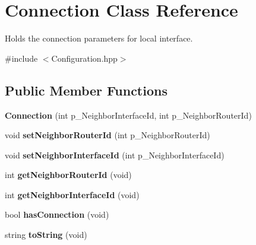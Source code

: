 \hypertarget{classConnection}{\section{Connection Class Reference}
\label{classConnection}
}


Holds the connection parameters for local interface.  




{\ttfamily \#include $<$Configuration.\-hpp$>$}

\subsection*{Public Member Functions}
\begin{DoxyCompactItemize}
\item 
\hypertarget{classConnection_a9686aa58b79ed0eed5ae0d4d2e67f063}{{\bfseries Connection} (int p\-\_\-\-Neighbor\-Interface\-Id, int p\-\_\-\-Neighbor\-Router\-Id)}\label{classConnection_a9686aa58b79ed0eed5ae0d4d2e67f063}

\item 
\hypertarget{classConnection_ac29c2a46399ef547746c308a74cda281}{void {\bfseries set\-Neighbor\-Router\-Id} (int p\-\_\-\-Neighbor\-Router\-Id)}\label{classConnection_ac29c2a46399ef547746c308a74cda281}

\item 
\hypertarget{classConnection_ab782704880dbb2a09dcdaf32ffc933fa}{void {\bfseries set\-Neighbor\-Interface\-Id} (int p\-\_\-\-Neighbor\-Interface\-Id)}\label{classConnection_ab782704880dbb2a09dcdaf32ffc933fa}

\item 
\hypertarget{classConnection_ac8c1278f4bef13f4ff468b14bef20c87}{int {\bfseries get\-Neighbor\-Router\-Id} (void)}\label{classConnection_ac8c1278f4bef13f4ff468b14bef20c87}

\item 
\hypertarget{classConnection_a67d5ae99b81ceb7544d20a440564041d}{int {\bfseries get\-Neighbor\-Interface\-Id} (void)}\label{classConnection_a67d5ae99b81ceb7544d20a440564041d}

\item 
\hypertarget{classConnection_ac70c6b1d8968a356e3da41f0b5db130d}{bool {\bfseries has\-Connection} (void)}\label{classConnection_ac70c6b1d8968a356e3da41f0b5db130d}

\item 
\hypertarget{classConnection_adfe081e8f1870d3fed68fe9a87fb5775}{string {\bfseries to\-String} (void)}\label{classConnection_adfe081e8f1870d3fed68fe9a87fb5775}

\end{DoxyCompactItemize}
